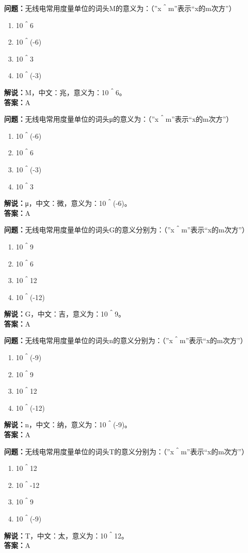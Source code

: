 \documentclass{ctexbook}%
\begin{document}
\textbf{问题：}无线电常用度量单位的词头M的意义为：（”x＾m”表示“x的m次方”）
\begin{enumerate}[label=\Alph*), leftmargin=3em]
\item 10＾6
\item 10＾(-6)
\item 10＾3
\item 10＾(-3)
\end{enumerate}
\textbf{解说：}M，中文：兆，意义为：10＾6。\\
\textbf{答案：}A

\textbf{问题：}无线电常用度量单位的词头μ的意义为：（”x＾m”表示“x的m次方”）
\begin{enumerate}[label=\Alph*), leftmargin=3em]
\item 10＾(-6)
\item 10＾6
\item 10＾(-3)
\item 10＾3
\end{enumerate}
\textbf{解说：}μ，中文：微，意义为：10＾(-6)。\\
\textbf{答案：}A

\textbf{问题：}无线电常用度量单位的词头G的意义分别为：（”x＾m”表示“x的m次方”）
\begin{enumerate}[label=\Alph*), leftmargin=3em]
\item 10＾9
\item 10＾6
\item 10＾12
\item 10＾(-12)
\end{enumerate}
\textbf{解说：}G，中文：吉，意义为：10＾9。\\
\textbf{答案：}A

\textbf{问题：}无线电常用度量单位的词头n的意义分别为：（”x＾m”表示“x的m次方”）
\begin{enumerate}[label=\Alph*), leftmargin=3em]
\item 10＾(-9)
\item 10＾9
\item 10＾12
\item 10＾(-12)
\end{enumerate}
\textbf{解说：}n，中文：纳，意义为：10＾(-9)。\\
\textbf{答案：}A

\textbf{问题：}无线电常用度量单位的词头T的意义分别为：（”x＾m”表示“x的m次方”）
\begin{enumerate}[label=\Alph*), leftmargin=3em]
\item 10＾12
\item 10＾-12
\item 10＾9
\item 10＾(-9)
\end{enumerate}
\textbf{解说：}T，中文：太，意义为：10＾12。\\
\textbf{答案：}A
\end{document}
